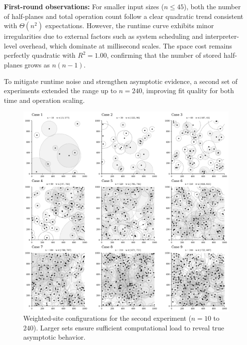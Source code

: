 \documentclass{article}
\begin{document}
\textbf{First-round observations:}
For smaller input sizes ($n\!\le\!45$), both the number of half-planes and total operation count follow a clear quadratic trend consistent with $\Theta(n^2)$ expectations.  
However, the runtime curve exhibits minor irregularities due to external factors such as system scheduling and interpreter-level overhead, which dominate at millisecond scales.  
The space cost remains perfectly quadratic with $R^2\!=\!1.00$, confirming that the number of stored half-planes grows as $n(n-1)$.

To mitigate runtime noise and strengthen asymptotic evidence, a second set of experiments extended the range up to $n=240$, improving fit quality for both time and operation scaling.

\begin{figure}[H]
    \centering
    \includegraphics[width=0.95\linewidth]{Pictures/test_sites2.png}
    \caption{Weighted-site configurations for the second experiment ($n=10$ to $240$). 
    Larger sets ensure sufficient computational load to reveal true asymptotic behavior.}
    \label{fig:test_sites2}
\end{figure}
\end{document}
